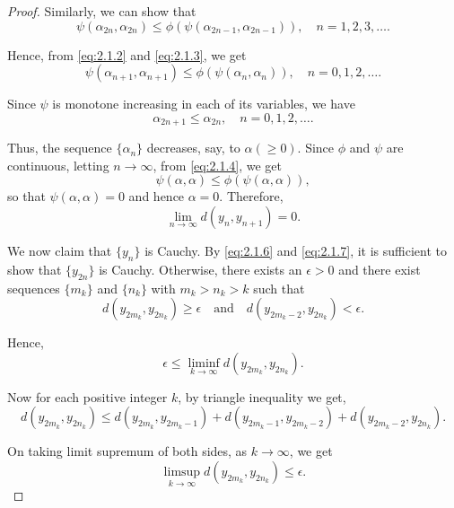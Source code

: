 \documentclass[11]{article}
\numberwithin{equation}{section}
\begin{document}
\begin{proof}
Similarly, we can show that
\begin{equation}\label{eq:2.1.3}
\psi(\alpha_{2n}, \alpha_{2n}) \leq \phi(\psi(\alpha_{2n-1}, \alpha_{2n-1})), \quad n = 1, 2, 3, \dotsc.
\end{equation}

Hence, from \eqref{eq:2.1.2} and \eqref{eq:2.1.3}, we get
\begin{equation}\label{eq:2.1.4}
\psi(\alpha_{n+1}, \alpha_{n+1}) \leq \phi(\psi(\alpha_{n}, \alpha_{n})), \quad n = 0, 1, 2, \dotsc.
\end{equation}

Since $\psi$ is monotone increasing in each of its variables, we have
\begin{equation}\label{eq:2.1.6}
\alpha_{2n+1} \leq \alpha_{2n}, \quad n = 0, 1, 2, \dotsc.
\end{equation}

Thus, the sequence $\{\alpha_n\}$ decreases, say, to $\alpha (\geq 0)$. Since $\phi$ and $\psi$ are continuous, letting $n \to \infty$, from \eqref{eq:2.1.4}, we get
\[
\psi(\alpha, \alpha) \leq \phi(\psi(\alpha, \alpha)),
\]
so that $\psi(\alpha, \alpha) = 0$ and hence $\alpha = 0$. Therefore,
\begin{equation}\label{eq:2.1.7}
\lim_{n\to\infty} d(y_n, y_{n+1}) = 0.
\end{equation}

We now claim that $\{y_n\}$ is Cauchy. By \eqref{eq:2.1.6} and \eqref{eq:2.1.7}, it is sufficient to show that $\{y_{2n}\}$ is Cauchy. Otherwise, there exists an $\epsilon > 0$ and there exist sequences $\{m_k\}$ and $\{n_k\}$ with $m_k > n_k > k$ such that
\begin{equation}\label{eq:2.1.8}
d(y_{2m_k}, y_{2n_k}) \geq \epsilon \quad \text{and} \quad d(y_{2m_k-2}, y_{2n_k}) < \epsilon.
\end{equation}

Hence,
\begin{equation}\label{eq:2.1.9}
\epsilon \leq \liminf_{k\to\infty} d(y_{2m_k}, y_{2n_k}).
\end{equation}

Now for each positive integer $k$, by triangle inequality we get,
\begin{equation*}
d(y_{2m_k}, y_{2n_k}) \leq d(y_{2m_k}, y_{2m_k-1}) + d(y_{2m_k-1}, y_{2m_k-2}) + d(y_{2m_k-2}, y_{2n_k}).
\end{equation*}

On taking limit supremum of both sides, as $k \to \infty$, we get
\begin{equation}\label{eq:2.1.10}
\limsup_{k\to\infty} d(y_{2m_k}, y_{2n_k}) \leq \epsilon.
\end{equation}


\end{proof}
\end{document}
